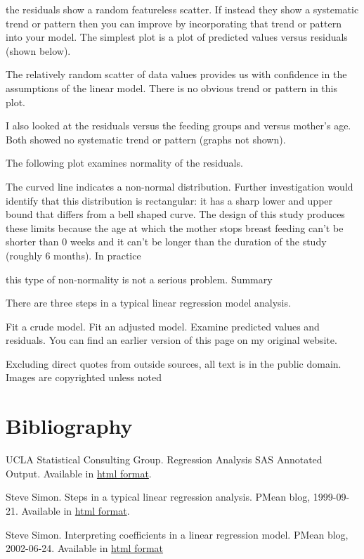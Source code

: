 \documentclass[
  letterpaper,
  DIV=11,
  numbers=noendperiod]{scrreprt}
\begin{document}
\begin{tcolorbox}
the residuals show a random featureless scatter. If instead they show a
systematic trend or pattern then you can improve by incorporating that
trend or pattern into your model. The simplest plot is a plot of
predicted values versus residuals (shown below).

The relatively random scatter of data values provides us with confidence
in the assumptions of the linear model. There is no obvious trend or
pattern in this plot.

I also looked at the residuals versus the feeding groups and versus
mother's age. Both showed no systematic trend or pattern (graphs not
shown).

The following plot examines normality of the residuals.

The curved line indicates a non-normal distribution. Further
investigation would identify that this distribution is rectangular: it
has a sharp lower and upper bound that differs from a bell shaped curve.
The design of this study produces these limits because the age at which
the mother stops breast feeding can't be shorter than 0 weeks and it
can't be longer than the duration of the study (roughly 6 months). In
practice

this type of non-normality is not a serious problem. Summary

There are three steps in a typical linear regression model analysis.

Fit a crude model. Fit an adjusted model. Examine predicted values and
residuals. You can find an earlier version of this page on my original
website.

Excluding direct quotes from outside sources, all text is in the public
domain. Images are copyrighted unless noted

\section{Bibliography}\label{bibliography-10}

UCLA Statistical Consulting Group. Regression Analysis \textbar{} SAS
Annotated Output. Available in
\href{https://stats.oarc.ucla.edu/sas/output/regression-analysis/}{html
format}.

Steve Simon. Steps in a typical linear regression analysis. PMean blog,
1999-09-21. Available in
\href{http://new.pmean.com/steps-in-linear-regression/}{html format}.

Steve Simon. Interpreting coefficients in a linear regression model.
PMean blog, 2002-06-24. Available in
\href{http://new.pmean.com/intepreting-linear-regression-coefficients/}{html
format}


\end{tcolorbox}
\end{document}
